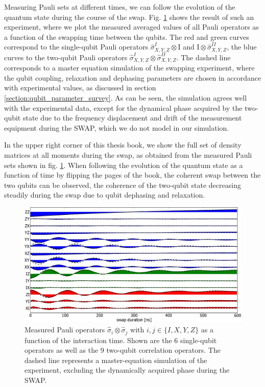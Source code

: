 Measuring Pauli sets at different times, we can follow the evolution of the quantum state during the course of the swap. Fig. \ref{fig:swap_pauli_set_vs_time_with_simulation} shows the result of such an experiment, where we plot the measured averaged values of all Pauli operators as a function of the swapping time between the qubits. The red and green curves correspond to the single-qubit Pauli operators $\hat{\sigma}^I_{X,Y,Z}\otimes \mathrm{I}$ and $\mathrm{I}\otimes \hat{\sigma}^{II}_{X,Y,Z}$, the blue curves to the two-qubit Pauli operators $\hat{\sigma}_{X,Y,Z}^I\otimes \hat{\sigma}_{X,Y,Z}^{II}$. The dashed line corresponds to a master equation simulation of the swapping experiment, where the qubit coupling, relaxation and dephasing parameters are chosen in accordance with experimental values, as discussed in section \ref{section:qubit_parameter_survey}. As can be seen, the simulation agrees well with the experimental data, except for the dynamical phase acquired by the two-qubit state due to the frequency displacement and drift of the measurement equipment during the SWAP, which we do not model in our simulation.

\smallskip

In the upper right corner of this thesis book, we show the full set of density matrices at all moments during the swap, as obtained from the measured Pauli sets shown in fig. \ref{fig:swap_pauli_set_vs_time_with_simulation}. When following the evolution of the quantum state as a function of time by flipping the pages of the book, the coherent swap between the two qubits can be observed, the coherence of the two-qubit state decreasing steadily during the swap due to qubit dephasing and relaxation.

\begin{figure}[ht!]
   \centering
	 \includegraphics[width=1.\textwidth]{"./data/ct5/film of swap/pauli_set_vs_time_with_simulation"}
	 \caption[]{Measured Pauli operators $\hat{\sigma}_i \otimes \hat{\sigma}_j$ with $i,j \in \{I,X,Y,Z\}$ as a function of the interaction time. Shown are the 6 single-qubit operators as well as the 9 two-qubit correlation operators. The dashed line represents a master-equation simulation of the experiment, excluding the dynamically acquired phase during the SWAP.}
	 \label{fig:swap_pauli_set_vs_time_with_simulation}
\end{figure}


